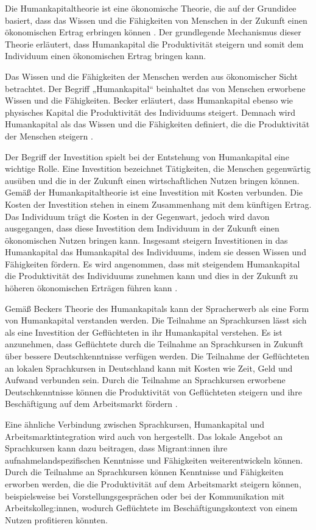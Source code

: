 Die Humankapitaltheorie ist eine ökonomische Theorie, die auf der Grundidee basiert, dass das Wissen und die Fähigkeiten von Menschen in der Zukunft einen ökonomischen Ertrag erbringen können \parencite{becker1964human}. Der grundlegende Mechanismus dieser Theorie erläutert, dass Humankapital die Produktivität steigern und somit dem Individuum einen ökonomischen Ertrag bringen kann.

Das Wissen und die Fähigkeiten der Menschen werden aus ökonomischer Sicht betrachtet. Der Begriff „Humankapital“ beinhaltet das von Menschen erworbene Wissen und die Fähigkeiten. Becker erläutert, dass Humankapital ebenso wie physisches Kapital die Produktivität des Individuums steigert. Demnach wird Humankapital als das Wissen und die Fähigkeiten definiert, die die Produktivität der Menschen steigern \parencite[7--10]{becker1964human}.

Der Begriff der Investition spielt bei der Entstehung von Humankapital eine wichtige Rolle. Eine Investition bezeichnet Tätigkeiten, die Menschen gegenwärtig ausüben und die in der Zukunft einen wirtschaftlichen Nutzen bringen können. Gemäß der Humankapitaltheorie ist eine Investition mit Kosten verbunden. Die Kosten der Investition stehen in einem Zusammenhang mit dem künftigen Ertrag. Das Individuum trägt die Kosten in der Gegenwart, jedoch wird davon ausgegangen, dass diese Investition dem Individuum in der Zukunft einen ökonomischen Nutzen bringen kann. Insgesamt steigern Investitionen in das Humankapital das Humankapital des Individuums, indem sie dessen Wissen und Fähigkeiten fördern. Es wird angenommen, dass mit steigendem Humankapital die Produktivität des Individuums zunehmen kann und dies in der Zukunft zu höheren ökonomischen Erträgen führen kann \parencite[7--10]{becker1964human}.

Gemäß Beckers Theorie des Humankapitals kann der Spracherwerb als eine Form von Humankapital verstanden werden. Die Teilnahme an Sprachkursen lässt sich als eine Investition der Geflüchteten in ihr Humankapital verstehen. Es ist anzunehmen, dass Geflüchtete durch die Teilnahme an Sprachkursen in Zukunft über bessere Deutschkenntnisse verfügen werden. Die Teilnahme der Geflüchteten an lokalen Sprachkursen in Deutschland kann mit Kosten wie Zeit, Geld und Aufwand verbunden sein. Durch die Teilnahme an Sprachkursen erworbene Deutschkenntnisse können die Produktivität von Geflüchteten steigern und ihre Beschäftigung auf dem Arbeitsmarkt fördern \parencite{becker1964human}.

Eine ähnliche Verbindung zwischen Sprachkursen, Humankapital und Arbeitsmarktintegration wird auch von \textcite{Kanas:2023} hergestellt. Das lokale Angebot an Sprachkursen kann dazu beitragen, dass Migrant:innen ihre aufnahmelandspezifischen Kenntnisse und Fähigkeiten weiterentwickeln können. Durch die Teilnahme an Sprachkursen können Kenntnisse und Fähigkeiten erworben werden, die die Produktivität auf dem Arbeitsmarkt steigern können, beispielsweise bei Vorstellungsgesprächen oder bei der Kommunikation mit Arbeitskolleg:innen, wodurch Geflüchtete im Beschäftigungskontext von einem Nutzen profitieren könnten.

